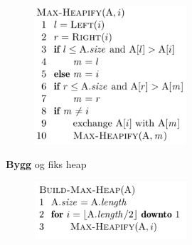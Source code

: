 \documentclass[12pt]{report}
\begin{document}
\vspace{\baselineskip}
\begin{multicols}{2}



\newpage

\par




\begin{figure}[H]
	\begin{Center}
		\includegraphics[width=2.23in,height=2.03in]{./media/image87.png}
	\end{Center}
\end{figure}



\par

{\fontsize{13pt}{15.6pt}\selectfont \textbf{Bygg} og fiks heap\par}\par




\begin{figure}[H]
	\begin{Center}
		\includegraphics[width=2.23in,height=0.84in]{./media/image88.png}
	\end{Center}
\end{figure}



\end{multicols}
\end{document}
